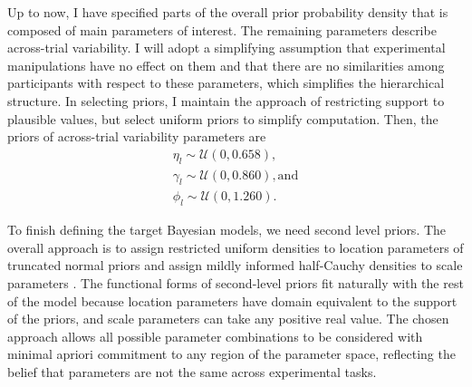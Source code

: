 \documentclass[12pt]{report}
\begin{document}
Up to now, I have specified parts of the overall prior probability density that is composed of main parameters of interest. The remaining parameters describe across-trial variability. I will adopt a simplifying assumption that experimental manipulations have no effect on them and that there are no similarities among participants with respect to these parameters, which simplifies the hierarchical structure. In selecting priors, I maintain the approach of restricting support to plausible values, but select uniform priors to simplify computation. Then, the priors of across-trial variability parameters are
\begin{eqnarray}
\eta_l \sim \mathcal{U}(0, 0.658), \nonumber \\ 
\gamma_l \sim \mathcal{U}(0, 0.860), \text{and} \\
\phi_l \sim \mathcal{U}(0, 1.260). \nonumber
\end{eqnarray}

To finish defining the target Bayesian models, we need second level priors. The overall approach is to assign restricted uniform densities to location parameters of truncated normal priors and assign mildly informed half-Cauchy densities to scale parameters \citep{PolSco2012,GelCar2013}. The functional forms of second-level priors fit naturally with the rest of the model because location parameters have domain equivalent to the support of the priors, and scale parameters can take any positive real value. The chosen approach allows all possible parameter combinations to be considered with minimal apriori commitment to any region of the parameter space, reflecting the belief that parameters are not the same across experimental tasks. 
\end{document}

